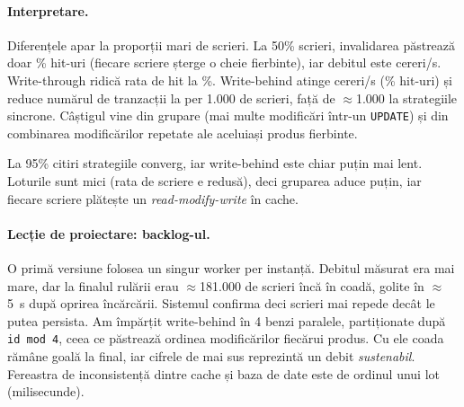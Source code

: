 \paragraph{Interpretare.} Diferențele apar la proporții mari de scrieri. La 50\% scrieri, invalidarea păstrează
doar \% hit-uri (fiecare scriere șterge o cheie fierbinte), iar debitul este
 cereri/s. Write-through ridică rata de hit la
\%. Write-behind atinge  cereri/s
(\% hit-uri) și reduce numărul de tranzacții la  per
1.000 de scrieri, față de $\approx$1.000 la strategiile sincrone. Câștigul vine din grupare (mai multe
modificări într-un \texttt{UPDATE}) și din combinarea modificărilor repetate ale aceluiași produs fierbinte.

La 95\% citiri strategiile converg, iar write-behind este chiar puțin mai lent. Loturile sunt mici (rata de
scriere e redusă), deci gruparea aduce puțin, iar fiecare scriere plătește un \emph{read-modify-write} în cache.

\paragraph{Lecție de proiectare: backlog-ul.} O primă versiune folosea un singur worker per instanță. Debitul
măsurat era mai mare, dar la finalul rulării erau $\approx$181.000 de scrieri încă în coadă, golite în
$\approx$5~s după oprirea încărcării. Sistemul confirma deci scrieri mai repede decât le putea persista. Am
împărțit write-behind în 4 benzi paralele, partiționate după \texttt{id mod 4}, ceea ce păstrează ordinea
modificărilor fiecărui produs. Cu ele coada rămâne goală la final, iar cifrele de mai sus reprezintă un debit
\emph{sustenabil}. Fereastra de inconsistență dintre cache și baza de date este de ordinul unui lot (milisecunde).
